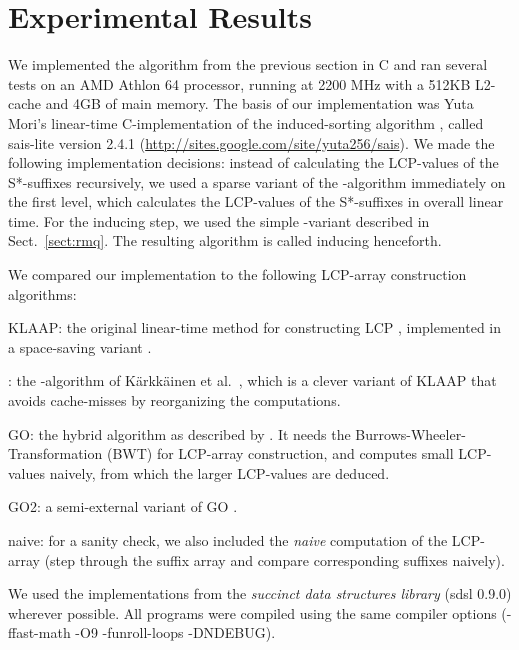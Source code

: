 \documentclass[11pt,onecolumn,final]{article} \usepackage[latin1]{inputenc}
\theoremstyle{plain}
\theoremstyle{remark}
\begin{document}
\section{Experimental Results}
\label{sect:practical}
We implemented the algorithm from the previous section in C and ran several tests on an AMD Athlon 64 processor, running at 2200 MHz with a 512KB L2-cache and 4GB of main memory. The basis of our implementation was Yuta Mori's linear-time C-implementation of the induced-sorting algorithm \cite{nong09linear}, called \textsf{sais-lite} version 2.4.1 (\url{http://sites.google.com/site/yuta256/sais}). We made the following implementation decisions: instead of calculating the LCP-values of the S*-suffixes recursively, we used a sparse variant of the -algorithm \cite{kaerkkaeinen09permuted} immediately on the first level, which calculates the LCP-values of the S*-suffixes in overall linear time. For the inducing step, we used the simple -variant described in Sect.~\ref{sect:rmq}. The resulting algorithm is called \textsf{inducing} henceforth.

We compared our implementation to the following LCP-array construction algorithms:
\begin{description}
\item \textsf{KLAAP}: the original linear-time method for constructing LCP \cite{kasai01linear}, implemented in a space-saving variant \cite{manzini04two}.
\item : the -algorithm of K\"arkk\"ainen et al.~\cite{kaerkkaeinen09permuted}, which is a clever variant of \textsf{KLAAP} that avoids cache-misses by reorganizing the computations.
\item \textsf{GO}: the hybrid algorithm as described by \cite{gog11fast}. It needs the Burrows-Wheeler-Transformation (BWT) for LCP-array construction, and computes small LCP-values naively, from which the larger LCP-values are deduced.
\item \textsf{GO2}: a semi-external variant of \textsf{GO} \cite{gog11fast}.
\item \textsf{naive}: for a sanity check, we also included the \emph{naive} computation of the LCP-array (step through the suffix array and compare corresponding suffixes naively).
\end{description}
We used the implementations from the \emph{succinct data structures library} (sdsl 0.9.0) \cite{gog11fast} wherever possible. All programs were compiled using the same compiler options (-ffast-math -O9 -funroll-loops -DNDEBUG).
\end{document}
